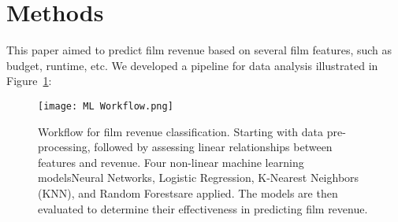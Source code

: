 \documentclass{article}
\begin{document}
\section{Methods}
\label{methods}
This paper aimed to predict film revenue based on several film features, such as budget, runtime, etc. We developed a pipeline for data analysis illustrated in Figure~\ref{fig:film_revenue_pipeline}:

\begin{figure}[H]
    \centering
    \vspace{0.3cm} %
    \texttt{[image: ML Workflow.png]} %
    \caption{Workflow for film revenue classification. Starting with data pre-processing, followed by assessing linear relationships between features and revenue. Four non-linear machine learning models\textemdash Neural Networks, Logistic Regression, K-Nearest Neighbors (KNN), and Random Forests\textemdash are applied. The models are then evaluated to determine their effectiveness in predicting film revenue.}
    \label{fig:film_revenue_pipeline}
\end{figure}
\end{document}
